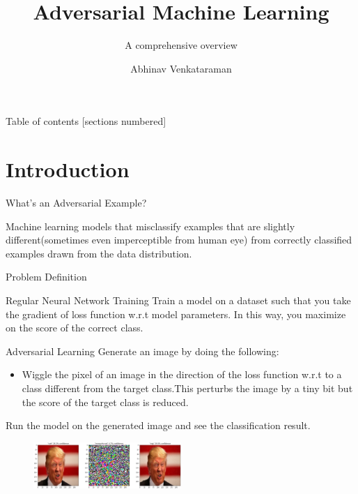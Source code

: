 \documentclass[10pt]{beamer}
\title{Adversarial Machine Learning}
\subtitle{A comprehensive overview}
\date{}
\author{Abhinav Venkataraman}
\institute{Samsung SDS Research America}
\begin{document}
\maketitle

\begin{frame}{Table of contents}
  [sections numbered]
  \tableofcontents[hideallsubsections]
\end{frame}

\section{Introduction}

\begin{frame}[fragile]{What's an Adversarial Example?}

	Machine learning models that misclassify examples that are slightly different(sometimes even imperceptible from human eye) from correctly classified examples drawn from the data distribution.

\end{frame}

\begin{frame}{Problem Definition}
	\begin{exampleblock}{Regular Neural Network Training}
	Train a model on a dataset such that you take the gradient of loss function w.r.t model parameters. In this way, you maximize on the score of the correct class.	
	\end{exampleblock}
	\pause
	\begin{alertblock}{Adversarial Learning}
	Generate an image by doing the following: 
	\pause
	\begin{itemize}
		\item Wiggle the pixel of an image in the direction of the loss function w.r.t to a class different from the target class.This perturbs the image by a tiny bit but the score of the target class is reduced. 
	\end{itemize}  
	Run the model on the generated image and see the classification result. 
	\begin{figure}
		\includegraphics[width=0.5\textwidth]{trump-adv}
	\end{figure}
	\end{alertblock}

\end{frame}
\end{document}
